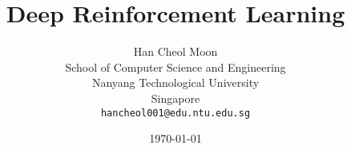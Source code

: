 \documentclass[oneside,a4paper,11pt]{book}
\begin{document}
\author{%
	Han Cheol Moon\\
	School of Computer Science and Engineering\\
	Nanyang Technological University\\
	Singapore\\
	\texttt{hancheol001@edu.ntu.edu.sg}
}
\title{Deep Reinforcement Learning}
\date{\today}

\frontmatter
\maketitle
\tableofcontents
\newpage

\mainmatter










\backmatter




\appendix

\end{document}
